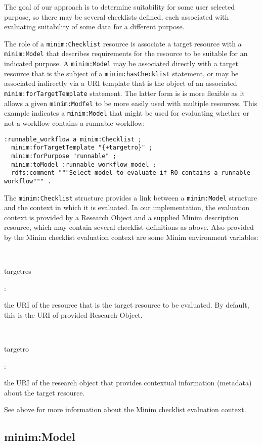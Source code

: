 \documentclass[]{article}
\begin{document}
The goal of our approach is to determine suitability for some user
selected purpose, so there may be several checklists defined, each
associated with evaluating suitability of some data for a different
purpose.

The role of a \texttt{minim:Checklist} resource is associate a target
resource with a \texttt{minim:Model} that describes requirements for the
resource to be suitable for an indicated purpose. A \texttt{minim:Model}
may be associated directly with a target resource that is the subject of
a \texttt{minim:hasChecklist} statement, or may be associated indirectly
via a URI template that is the object of an associated
\texttt{minim:forTargetTemplate} statement. The latter form is is more
flexible as it allows a given \texttt{minim:Modfel} to be more easily
used with multiple resources. This example indicates a
\texttt{minim:Model} that might be used for evaluating whether or not a
workflow contains a runnable workflow:

\begin{verbatim}
:runnable_workflow a minim:Checklist ;
  minim:forTargetTemplate "{+targetro}" ;
  minim:forPurpose "runnable" ;
  minim:toModel :runnable_workflow_model ;
  rdfs:comment """Select model to evaluate if RO contains a runnable workflow""" .
\end{verbatim}

The \texttt{minim:Checklist} structure provides a link between a
\texttt{minim:Model} structure and the context in which it is evaluated.
In our implementation, the evaluation context is provided by a Research
Object and a supplied Minim description resource, which may contain
several checklist definitions as above. Also provided by the Minim
checklist evaluation context are some Minim environment variables:

~~

targetres

:

the URI of the resource that is the target resource to be evaluated. By
default, this is the URI of provided Research Object.

~~

targetro

:

the URI of the research object that provides contextual information
(metadata) about the target resource.

See above for more information about the Minim checklist evaluation
context.

\subsection{minim:Model}
\end{document}
